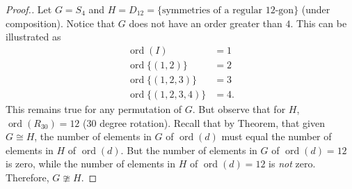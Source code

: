 \documentclass[11pt,twoside]{article}
\begin{document}
\begin{enumerate}
\begin{enumerate}
\begin{proof}[\color{red}Proof.]Let $G = S_4$ and $H = D_{12} = \{\text{symmetries of a regular } 12\text{-gon}\}$ (under composition).  Notice that $G$ does not have an order greater than $4$.  This can be illustrated as
\begin{align*}
\operatorname{ord}(I) &= 1\\
\operatorname{ord}\{(1,2)\} &= 2\\
\operatorname{ord}\{(1,2,3)\} &= 3\\
\operatorname{ord}\{(1,2,3,4)\} &= 4.
\end{align*}
This remains true for any permutation of $G$.  But observe that for $H$, $\operatorname{ord}(R_{30}) = 12$ (30 degree rotation).  Recall that by Theorem, that given $G \cong H$, the number of elements in $G$ of $\operatorname{ord}(d)$ must equal the number of elements in $H$ of $\operatorname{ord}(d)$.  But the number of elements in $G$ of $\operatorname{ord}(d) = 12$ is zero, while the number of elements in $H$ of $\operatorname{ord}(d) = 12$ is \emph{not} zero.  Therefore, $G \ncong H$.
\end{proof}
 
 \vspace{0.25cm}
 
\end{enumerate}

\end{enumerate}
\end{document}
